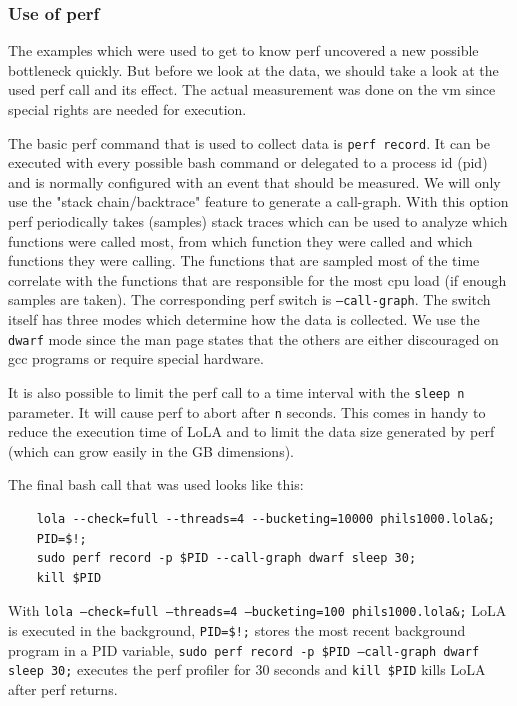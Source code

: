 \subsubsection{Use of perf}
The examples which were used to get to know perf uncovered a new possible bottleneck quickly. But before we look at the data, we should take a look at the used perf call and its effect. The actual measurement was done on the vm since special rights are needed for execution.

The basic perf command that is used to collect data is \texttt{perf record}. It can be executed with every possible bash command or delegated to a process id (pid) and is normally configured with an event that should be measured. We will only use the "stack chain/backtrace" feature to generate a call-graph. With this option perf periodically takes (samples) stack traces which can be used to analyze which functions were called most, from which function they were called and which functions they were calling. The functions that are sampled most of the time correlate with the functions that are responsible for the most cpu load (if enough samples are taken). The corresponding perf switch is \texttt{--call-graph}. The switch itself has three modes which determine how the data is collected. We use the \texttt{dwarf} mode since the man page states that the others are either discouraged on gcc programs or require special hardware.

It is also possible to limit the perf call to a time interval with the \texttt{sleep n} parameter. It will cause perf to abort after \texttt{n} seconds. This comes in handy to reduce the execution time of LoLA and to limit the data size generated by perf (which can grow easily in the GB dimensions).

The final bash call that was used looks like this:
\begin{lstlisting}
    lola --check=full --threads=4 --bucketing=10000 phils1000.lola&;
    PID=$!;
    sudo perf record -p $PID --call-graph dwarf sleep 30;
    kill $PID
\end{lstlisting}
With \texttt{lola --check=full --threads=4 --bucketing=100 phils1000.lola\&;} LoLA  is executed in the background, \texttt{PID=\$!;} stores the most recent background program in a PID variable, \texttt{sudo perf record -p \$PID --call-graph dwarf sleep 30;} executes the perf profiler for 30 seconds and \texttt{kill \$PID} kills LoLA after perf returns.

